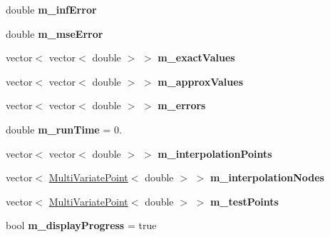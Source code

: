 \begin{DoxyCompactItemize}
\item 
double {\bfseries m\+\_\+inf\+Error}\hypertarget{class_interpolation_a1d083a2ff347e984973eff40a324f1fc}{}\label{class_interpolation_a1d083a2ff347e984973eff40a324f1fc}

\item 
double {\bfseries m\+\_\+mse\+Error}\hypertarget{class_interpolation_a183d7179ea92d9fcb0e9055a815676b8}{}\label{class_interpolation_a183d7179ea92d9fcb0e9055a815676b8}

\item 
vector$<$ vector$<$ double $>$ $>$ {\bfseries m\+\_\+exact\+Values}\hypertarget{class_interpolation_a7803c20fc8dab69981711ded82cee749}{}\label{class_interpolation_a7803c20fc8dab69981711ded82cee749}

\item 
vector$<$ vector$<$ double $>$ $>$ {\bfseries m\+\_\+approx\+Values}\hypertarget{class_interpolation_af16fffc8a282e0e29d6f79fcb9cdcd00}{}\label{class_interpolation_af16fffc8a282e0e29d6f79fcb9cdcd00}

\item 
vector$<$ vector$<$ double $>$ $>$ {\bfseries m\+\_\+errors}\hypertarget{class_interpolation_a58fc987e95030cd47b5954440f6062f4}{}\label{class_interpolation_a58fc987e95030cd47b5954440f6062f4}

\item 
double {\bfseries m\+\_\+run\+Time} = 0.\hypertarget{class_interpolation_a384600c1a97ef6592b59c78bef102c6f}{}\label{class_interpolation_a384600c1a97ef6592b59c78bef102c6f}

\item 
vector$<$ vector$<$ double $>$ $>$ {\bfseries m\+\_\+interpolation\+Points}\hypertarget{class_interpolation_a60e1bdf1adbc7fb5eae27b8d439124be}{}\label{class_interpolation_a60e1bdf1adbc7fb5eae27b8d439124be}

\item 
vector$<$ \hyperlink{class_multi_variate_point}{Multi\+Variate\+Point}$<$ double $>$ $>$ {\bfseries m\+\_\+interpolation\+Nodes}\hypertarget{class_interpolation_aab428f896fb29cda3f393267801c6bb0}{}\label{class_interpolation_aab428f896fb29cda3f393267801c6bb0}

\item 
vector$<$ \hyperlink{class_multi_variate_point}{Multi\+Variate\+Point}$<$ double $>$ $>$ {\bfseries m\+\_\+test\+Points}\hypertarget{class_interpolation_af12eca065aea0c9ba4fb8529d925c916}{}\label{class_interpolation_af12eca065aea0c9ba4fb8529d925c916}

\item 
bool {\bfseries m\+\_\+display\+Progress} = true\hypertarget{class_interpolation_ab62cce9e5221ef256bd34824e7333744}{}\label{class_interpolation_ab62cce9e5221ef256bd34824e7333744}

\end{DoxyCompactItemize}


